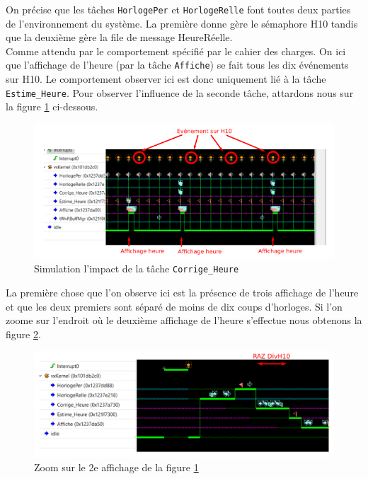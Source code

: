 \documentclass[french]{article}
\begin{document}
	On précise que les tâches \texttt{HorlogePer} et \texttt{HorlogeRelle} font toutes deux parties de l'environnement du système. La première donne gère le sémaphore H10 tandis que la deuxième gère la file de message HeureRéelle.\\
	Comme attendu par le comportement spécifié par le cahier des charges. On ici que l'affichage de l'heure (par la tâche \texttt{Affiche}) se fait tous les dix événements sur H10. Le comportement observer ici est donc uniquement lié à la tâche \texttt{Estime\_Heure}. Pour observer l'influence de la seconde tâche, attardons nous sur la figure \ref{fig:interruption_corrige_heure} ci-dessous.
	
	\begin{figure}[H]
		\centering
		\includegraphics[width=16cm]{photo/affichage_normal/interruption_corrige_heure}
		\caption{Simulation l'impact de la tâche \texttt{Corrige\_Heure}}
		\label{fig:interruption_corrige_heure}
	\end{figure}
	
	La première chose que l'on observe ici est la présence de trois affichage de l'heure et que les deux premiers sont séparé de moins de dix coups d'horloges. Si l'on zoome sur l'endroit où le deuxième affichage de l'heure s'effectue nous obtenons la figure \ref{fig:semB}.

	\begin{figure}[H]
		\centering
		\includegraphics[width=16cm]{photo/affichage_normal/semB}
		\caption{Zoom sur le 2e affichage de la figure \ref{fig:interruption_corrige_heure}}
		\label{fig:semB}
	\end{figure}
\end{document}
